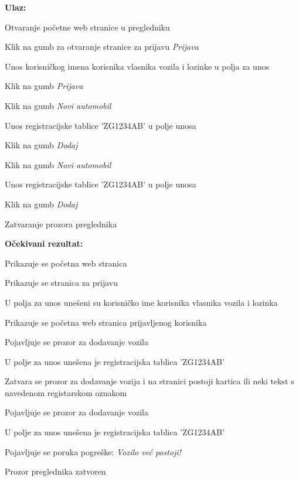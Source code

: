 			\hfill\break
			\noindent\textbf{Ulaz:}
			
			\begin{packed_enum}
				
				\item Otvaranje početne web stranice u pregledniku
				\item Klik na gumb za otvaranje stranice za prijavu \textit{Prijava}
				\item Unos korisničkog imena korisnika vlasnika vozila i lozinke u polja za unos
				\item Klik na gumb  \textit{Prijava}
				\item Klik na gumb \textit{Novi automobil}
				\item Unos registracijske tablice 'ZG1234AB' u polje unosa
				\item Klik na gumb \textit{Dodaj}
				\item Klik na gumb \textit{Novi automobil}
				\item Unos registracijske tablice 'ZG1234AB' u polje unosa
				\item Klik na gumb \textit{Dodaj}
				\item Zatvaranje prozora preglednika
				
			\end{packed_enum}
			
			\noindent\textbf{Očekivani rezultat:}
			
			\begin{packed_enum}
				
				\item Prikazuje se početna web stranica
				\item Prikazuje se stranica za prijavu
				\item U polja za unos unešeni su korisničko ime korisnika vlasnika vozila i lozinka
				\item Prikazuje se početna web stranica prijavljenog korisnika
				\item Pojavljuje se prozor za dodavanje vozila
				\item U polje za unos unešena je registracijska tablica 'ZG1234AB'
				\item Zatvara se prozor za dodavanje vozija i na stranici postoji kartica ili neki tekst s navedenom registarskom oznakom
				\item Pojavljuje se prozor za dodavanje vozila
				\item U polje za unos unešena je registracijska tablica 'ZG1234AB'
				\item Pojavljuje se poruka pogreške: \textit{Vozilo već postoji!}
				\item Prozor preglednika zatvoren
				
			\end{packed_enum}
			
